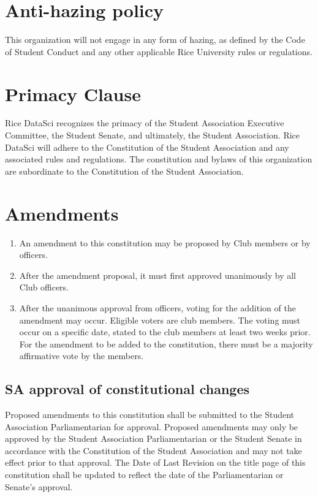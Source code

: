 \documentclass[12pt]{article}
\begin{document}
\section{Anti-hazing policy}

This organization will not engage in any form of hazing, as defined by the Code
of Student Conduct and any other applicable Rice University rules or
regulations.


\section{Primacy Clause}

Rice DataSci recognizes the primacy of the Student Association Executive
Committee, the Student Senate, and ultimately, the Student Association. Rice
DataSci will adhere to the Constitution of the Student Association and any
associated rules and regulations. The constitution and bylaws of this
organization are subordinate to the Constitution of the Student Association.


\section{Amendments}

\begin{enumerate}
  \item An amendment to this constitution may be proposed by Club members or by
    officers. 

  \item After the amendment proposal, it must first approved unanimously by all
    Club officers. 

  \item After the unanimous approval from officers, voting for the addition of
    the amendment may occur. Eligible voters are club members. The voting must
    occur on a specific date, stated to the club members at least two weeks
    prior. For the amendment to be added to the constitution, there must be a
    majority affirmative vote by the members.  
\end{enumerate}

\subsection{SA approval of constitutional changes}

Proposed amendments to this constitution shall be submitted to the Student
Association Parliamentarian for approval. Proposed amendments may only be
approved by the Student Association Parliamentarian or the Student Senate in
accordance with the Constitution of the Student Association and may not take
effect prior to that approval. The Date of Last Revision on the title page of
this constitution shall be updated to reflect the date of the Parliamentarian
or Senate’s approval.
\end{document}
